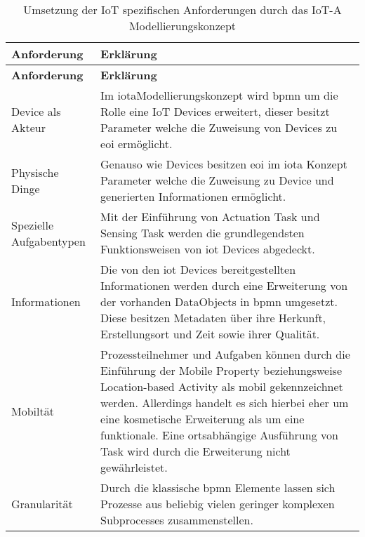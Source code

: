  \begin{longtable}{P{4cm}|X}
  \caption{Umsetzung der IoT spezifischen Anforderungen durch das IoT-A Modellierungskonzept}\\
  \label{table:evaluierungskriterien}
  \textbf{Anforderung} & \textbf{Erklärung}   \\ \hline
  \endfirsthead %
  \textbf{Anforderung} & \textbf{Erklärung}  \\ \hline
  \endhead
  Device als Akteur & Im \ac{iota}Modellierungskonzept wird \ac{bpmn} um die Rolle eine IoT Devices erweitert, dieser besitzt Parameter welche die Zuweisung von Devices zu \ac{eoi} ermöglicht.\\ \hline
  Physische Dinge  & Genauso wie Devices besitzen \ac{eoi} im \ac{iota} Konzept Parameter welche die Zuweisung zu Device und generierten Informationen ermöglicht.\\ \hline
  Spezielle Aufgabentypen & Mit der Einführung von Actuation Task und Sensing Task werden die grundlegendsten Funktionsweisen von \ac{iot} Devices abgedeckt.\\ \hline
  Informationen  & Die von den \ac{iot} Devices bereitgestellten Informationen werden durch eine Erweiterung von der vorhanden DataObjects in \ac{bpmn} umgesetzt. Diese besitzen Metadaten über ihre Herkunft, Erstellungsort und Zeit sowie ihrer Qualität.\\ \hline
  Mobiltät & Prozessteilnehmer und Aufgaben können durch die Einführung der Mobile Property beziehungsweise Location-based Activity als mobil gekennzeichnet werden. Allerdings handelt es sich hierbei eher um eine kosmetische Erweiterung als um eine funktionale. Eine ortsabhängige Ausführung von Task wird durch die Erweiterung nicht gewährleistet.\\ \hline
  Granularität & Durch die klassische \ac{bpmn} Elemente lassen sich Prozesse aus beliebig vielen geringer komplexen Subprocesses zusammenstellen.\\
 \end{longtable}
